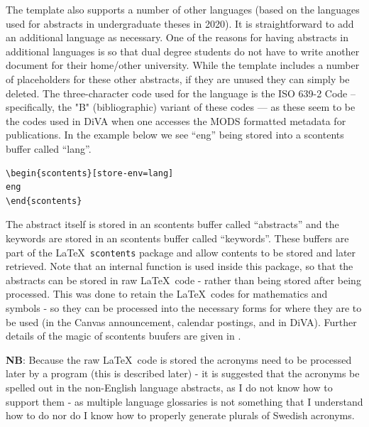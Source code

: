 The template also supports a number of other languages (based on the languages used for abstracts in undergraduate theses in 2020). It is straightforward to add an additional language as necessary. One of the reasons for having abstracts in additional languages is so that dual degree students do not have to write another document for their home/other university. While the template includes a number of placeholders for these other abstracts, if they are unused they can simply be deleted.
The three-character code used for the language is the ISO 639-2 Code – specifically, the "B" (bibliographic) variant of these codes --- as these seem to be the codes used in DiVA when one accesses the MODS formatted metadata for publications. In the example below we see “eng” being stored into a scontents buffer called “lang”.
\begin{lstlisting}[language={[LaTeX]TeX}, caption={Storing the language in a scontents buffer named "lang"}, label=lst:EnglishAbstractLang] 
\begin{scontents}[store-env=lang]
eng
\end{scontents}
\end{lstlisting}

The abstract itself is stored in an scontents buffer called “abstracts” and the keywords are stored in an scontents buffer called “keywords”.  These buffers are part of the \LaTeX~\texttt{scontents} package and allow contents to be stored and later retrieved. Note that an internal function is used inside this package, so that the abstracts can be stored in raw \LaTeX~code - rather than being stored after being processed. This was done to retain the \LaTeX~codes for mathematics and symbols - so they can be processed into the necessary forms for where they are to be used (\ie in the Canvas announcement, calendar postings, and in DiVA). Further details of the magic of scontents buufers are given in .

\textbf{NB}: Because the raw \LaTeX~code is stored the acronyms need to be processed later by a program (this is described later) - it is suggested that the acronyms be spelled out in the non-English language abstracts, as I do not know how to support them - as multiple language glossaries is not something that I understand how to do nor do I know how to properly generate plurals of Swedish acronyms.

